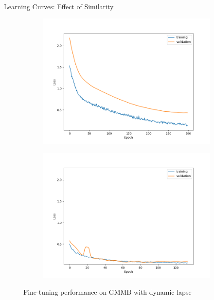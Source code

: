 \documentclass[9pt,handout]{beamer}
\begin{document}
\begin{frame}{Learning Curves: Effect of Similarity}
    \begin{figure}[ht]
        \centering
        \begin{subfigure}{0.48\textwidth}
            \includegraphics[width=\textwidth]{../project3/figures/figure2a.png}
        \end{subfigure}
        \begin{subfigure}{0.48\textwidth}
            \includegraphics[width=\textwidth]{../project3/figures/figure2b.png}
        \end{subfigure}
        \caption{Fine-tuning performance on GMMB with dynamic lapse}
    \end{figure}


\end{frame}
\end{document}
